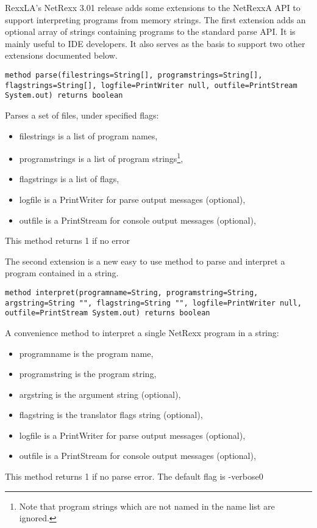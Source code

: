 RexxLA's NetRexx 3.01 release adds some extensions to the NetRexxA API to support interpreting programs from memory strings. The first extension adds an optional array of strings containing programs to the standard parse API. It is mainly useful to IDE developers. It also serves as the basis to support two other extensions documented below.
\begin{lstlisting}[label=memorystrings,caption=parse program in
  memory buffer]
method parse(filestrings=String[], programstrings=String[], flagstrings=String[], logfile=PrintWriter null, outfile=PrintStream System.out) returns boolean
\end{lstlisting}

Parses a set of files, under specified flags:
\begin{itemize}
\item filestrings is a list of program names,
\item programstrings is a list of program strings\footnote{Note that program strings which are not named in the name list are ignored.},
\item flagstrings is a list of flags,
\item logfile is a PrintWriter for parse output messages (optional),
\item outfile is a PrintStream for console output messages (optional),
\end{itemize}
This method returns 1 if no error


The second extension is a new easy to use method to parse and interpret a program contained in a string.
\begin{lstlisting}[label=memorystrings2,caption=parse program in string]
method interpret(programname=String, programstring=String, argstring=String "", flagstring=String "", logfile=PrintWriter null, outfile=PrintStream System.out) returns boolean
\end{lstlisting}
A convenience method to interpret a single NetRexx program in a string:
\begin{itemize}
\item programname is the program name,
\item programstring is the program string,
\item argstring is the argument string (optional),
\item flagstring is the translator flags string (optional),
\item logfile is a PrintWriter for parse output messages (optional),
\item outfile is a PrintStream for console output messages (optional),
\end{itemize}
This method returns 1 if no parse error. The default flag is -verbose0

